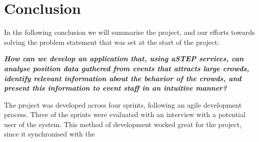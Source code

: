 \chapter{Conclusion}\label{ch:conclusion}


In the following conclusion we will summarise the project, and our efforts towards solving the problem statement that was set at the start of the project:

\vspace{0.5 cm}
\begin{center}
	\textbf{\textit{How can we develop an application that, using aSTEP services, can analyse position data gathered from events that attracts large crowds, identify relevant information about the behavior of the crowds, and present this information to event staff in an intuitive manner?}}
\end{center}

The project was developed across four sprints, following an agile development process. Three of the sprints were evaluated with an interview with a potential user of the system. This method of development worked great for the project, since it synchronised with the 





